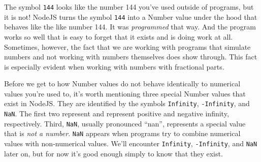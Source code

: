 The symbol \texttt{144} looks like the number 144 you've used outside of programs, but it is not! NodeJS turns the symbol \texttt{144} into a \textsf{Number} value under the hood that behaves like the like number 144. It was \emph{programmed} that way. And the program works so well that is easy to forget that it exists and is doing work at all. Sometimes, however, the fact that we are working with programs that simulate numbers and not working with numbers themselves does show through. This fact is especially evident when working with numbers with fractional parts.


Before we get to how \textsf{Number} values do not behave identically to numerical values you're used to, it's worth mentioning three special \textsf{Number} values that exist in NodeJS. They are identified by the symbols \texttt{Infinity}, \texttt{-Infinity}, and \texttt{NaN}. The first two represent and represent positive and negative infinity, respectively. Third, \texttt{NaN}, usually pronounced ``nan'', represents a special value that is \emph{not a number}. \texttt{NaN} appears when programs try to combine numerical values with non-numerical values. We'll encounter \texttt{Infinity}, \texttt{-Infinity}, and \texttt{NaN} later on, but for now it's good enough simply to know that they exist.

